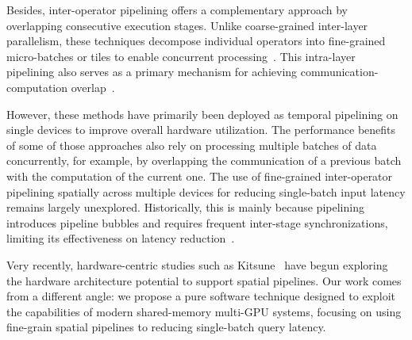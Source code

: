 Besides, inter-operator pipelining offers a complementary approach by overlapping consecutive execution stages. Unlike coarse-grained inter-layer parallelism, these techniques decompose individual operators into fine-grained micro-batches or tiles to enable concurrent processing~\cite{zheng2017versapipe,  cusync2024, zhang2025hytis}. This intra-layer pipelining also serves as a primary mechanism for achieving communication-computation overlap~\cite{zhu2025nanoflow, chang2024flux, wang2023overlap}. 

However, these methods have primarily been deployed as temporal pipelining on single devices to improve overall hardware utilization. The performance benefits of some of those approaches also rely on processing multiple batches of data concurrently, for example, by overlapping the communication of a previous batch with the computation of the current one. The use of fine-grained inter-operator pipelining spatially across multiple devices for reducing single-batch input latency remains largely unexplored. Historically, this is mainly because pipelining introduces pipeline bubbles and requires frequent inter-stage synchronizations, limiting its effectiveness on latency reduction~\cite{zheng2022alpa}.

Very recently, hardware-centric studies such as Kitsune~\cite{davies2025kitsune} have begun exploring the hardware architecture potential to support spatial pipelines. Our work comes from a different angle: we propose a pure software technique designed to exploit the capabilities of modern shared-memory multi-GPU systems, focusing on using fine-grain spatial pipelines to reducing single-batch query latency.
